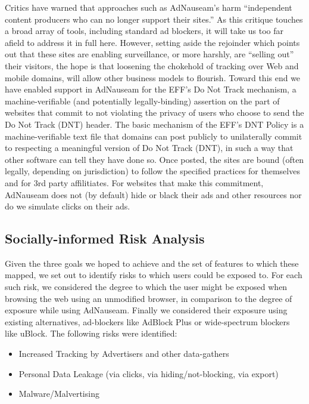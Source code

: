 \documentclass[conference]{IEEEtran}
\begin{document}
Critics have warned that approaches such as AdNauseam’s harm ``independent content producers who can no longer support their sites.'' As this critique touches a broad array of tools, including standard ad blockers, it will take us too far afield to address it in full here.  However, setting aside the rejoinder which points out that these sites are enabling surveillance, or more harshly, are ``selling out'' their visitors, the hope is that loosening the chokehold of tracking over Web and mobile domains, will allow other business models to flourish. Toward this end we have enabled support in AdNauseam for the EFF's Do Not Track mechanism, a machine-verifiable (and potentially legally-binding) assertion on the part of websites that commit to not violating the privacy of users who choose to send the Do Not Track (DNT) header. The basic mechanism of the EFF's DNT Policy is a machine-verifiable text file that domains can post publicly to unilaterally commit to respecting a meaningful version of Do Not Track (DNT), in such a way that other software can tell they have done so. Once posted, the sites are bound (often legally, depending on jurisdiction) to follow the specified practices for themselves and for 3rd party affilitiates. For websites that make this commitment, AdNauseam does not (by default) hide or black their ads and other resources nor do we simulate clicks on their ads.

\subsection{Socially-informed Risk Analysis}

Given the three goals we hoped to achieve and the set of features to which these mapped, we set out to identify risks to which users could be exposed to. For each such risk, we considered the degree to which the user might be exposed when browsing the web using an unmodified browser, in comparison to the degree of exposure while using AdNauseam. Finally we considered their exposure using existing alternatives, ad-blockers like AdBlock Plus\cite{AdBlock} or wide-spectrum blockers like uBlock\cite{Gorhill}. The following risks were identified:

\begin{itemize}
  \item Increased Tracking by Advertisers and other data-gathers
  \item Personal Data Leakage (via clicks, via hiding/not-blocking, via export)
  \item Malware/Malvertising
\end{itemize}
\end{document}
